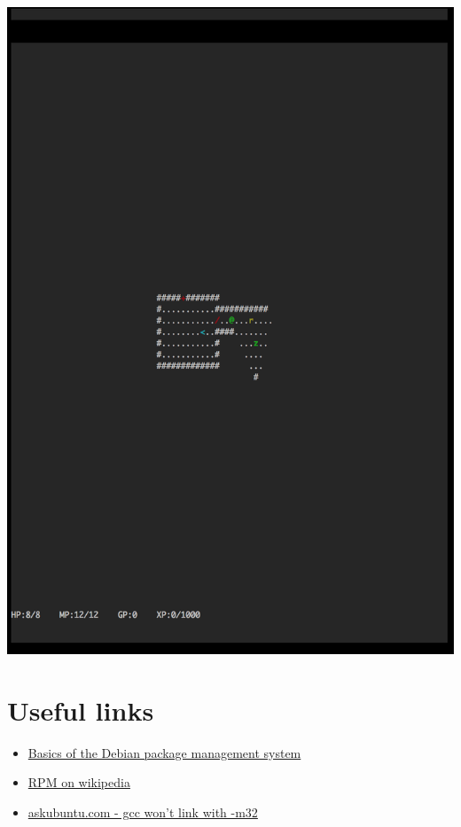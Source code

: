 \documentclass[a4paper,11pt]{article}
\begin{document}
\includegraphics[width=17cm]{3.png}



\section{Useful links}
\begin{itemize}
  \item \href{https://www.debian.org/doc/manuals/debian-faq/ch-pkg_basics.en.html}{Basics of the Debian package management system}
  \item \href{https://en.wikipedia.org/wiki/RPM_Package_Manager}{RPM on wikipedia}
  \item \href{http://askubuntu.com/questions/453681/gcc-wont-link-with-m32}{askubuntu.com - gcc won't link with -m32}
\end{itemize}
\end{document}
